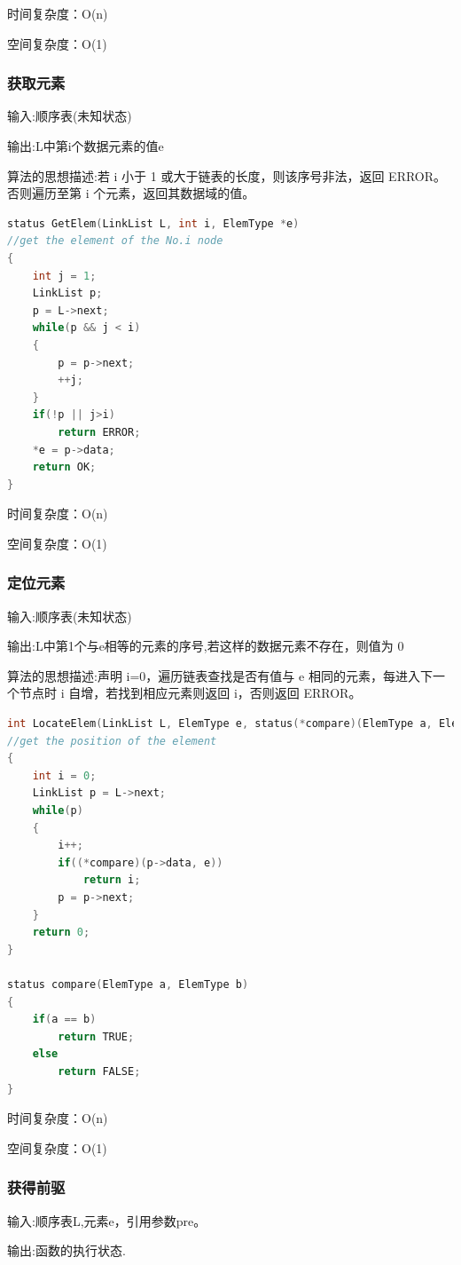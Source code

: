 \documentclass[supercite]{Experimental_Report}
\theoremstyle{definition}
\begin{document}
时间复杂度：O(n)

空间复杂度：O(1)
\subsubsection{获取元素}
输入:顺序表(未知状态)

输出:L中第i个数据元素的值e

算法的思想描述:若 i 小于 1 或大于链表的长度，则该序号非法，返回 ERROR。否则遍历至第 i 个元素，返回其数据域的值。	
\begin{lstlisting}[language=C] 
status GetElem(LinkList L, int i, ElemType *e)
//get the element of the No.i node
{
	int j = 1;
	LinkList p;
	p = L->next;
	while(p && j < i)
	{
		p = p->next;
		++j;
	}
	if(!p || j>i)
		return ERROR;
	*e = p->data;
	return OK;
}
\end{lstlisting}

时间复杂度：O(n)

空间复杂度：O(1)
\subsubsection{定位元素}
输入:顺序表(未知状态)

输出:L中第1个与e相等的元素的序号,若这样的数据元素不存在，则值为 0

算法的思想描述:声明 i=0，遍历链表查找是否有值与 e 相同的元素，每进入下一个节点时 i 自增，若找到相应元素则返回 i，否则返回 ERROR。
\begin{lstlisting}[language=C] 
int LocateElem(LinkList L, ElemType e, status(*compare)(ElemType a, ElemType b))
//get the position of the element
{
	int i = 0;
	LinkList p = L->next;
	while(p)
	{
		i++;
		if((*compare)(p->data, e))
			return i;
		p = p->next;
	}
	return 0;
}

status compare(ElemType a, ElemType b)
{
    if(a == b)
        return TRUE;
    else
        return FALSE;
}
\end{lstlisting}

时间复杂度：O(n)

空间复杂度：O(1)
\subsubsection{获得前驱}

输入:顺序表L,元素e，引用参数pre。

输出:函数的执行状态.
\end{document}
